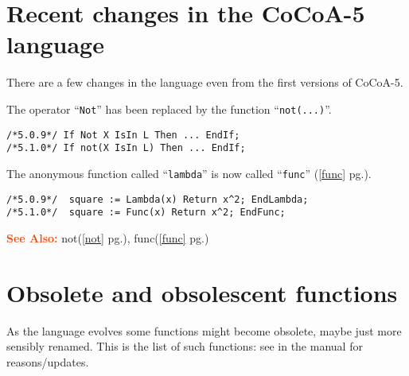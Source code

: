 \documentclass[a4paper]{mybook}
\newcommand\SeeAlso{\par\textcolor{OrangeRed}{\textbf{\large See Also: }}}
\begin{document}
\section{Recent changes in the CoCoA-5 language}
\label{Recent changes in the CoCoA-5 language}

        
There are a few changes in the language even from the first versions
of CoCoA-5.
\par 
The operator ``\verb&Not&'' has been replaced by the function ``\verb&not(...)&''.
\begin{Verbatim}[label=example, rulecolor=\color{PineGreen}, frame=single]
/*5.0.9*/ If Not X IsIn L Then ... EndIf;
/*5.1.0*/ If not(X IsIn L) Then ... EndIf;
\end{Verbatim}

The anonymous function called ``\verb&lambda&'' is now called ``\verb&func&'' (\ref{func} pg.\pageref{func}).
\begin{Verbatim}[label=example, rulecolor=\color{PineGreen}, frame=single]
/*5.0.9*/  square := Lambda(x) Return x^2; EndLambda;
/*5.1.0*/  square := Func(x) Return x^2; EndFunc;
\end{Verbatim}


\SeeAlso %
  not(\ref{not} pg.\pageref{not}), 
    func(\ref{func} pg.\pageref{func})

\section{Obsolete and obsolescent functions}
\label{Obsolete and obsolescent functions}

        
As the language evolves some functions might become obsolete, maybe
just more sensibly renamed.  This is the list of such functions: see
in the manual for reasons/updates.
\end{document}
